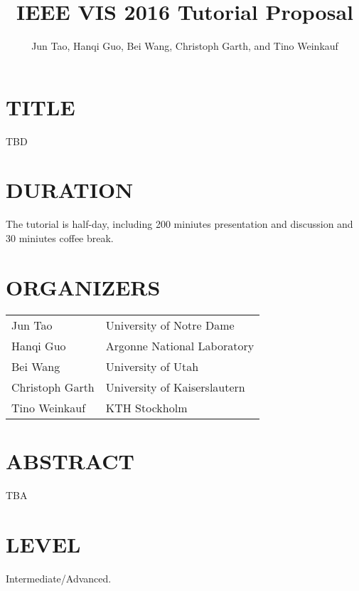 \documentclass[preprint,journal]{vgtc}       %
\title{IEEE VIS 2016 Tutorial Proposal}
\author{Jun Tao, Hanqi Guo, Bei Wang, Christoph Garth, and Tino Weinkauf}
\begin{document}


\maketitle

\section*{TITLE}
TBD

\section*{DURATION}
The tutorial is half-day, including 200 miniutes presentation and discussion and 30 miniutes coffee break.

\section*{ORGANIZERS}

\vspace{-0.1in}
\begin{table}[H]
\begin{tabular}{ll}
Jun Tao & University of Notre Dame\\
Hanqi Guo & Argonne National Laboratory\\
Bei Wang & University of Utah\\
Christoph Garth & University of Kaiserslautern\\
Tino Weinkauf & KTH Stockholm
\end{tabular}
\end{table}

\section*{ABSTRACT}
TBA

\section*{LEVEL}
Intermediate/Advanced.
\end{document}
